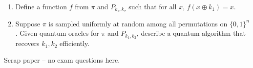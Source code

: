 \documentclass[12pt,answers,addpoints]{exam}
\newcommand{\bit}{\{0,1\}}
\begin{document}
\begin{questions}
\begin{parts}
      \begin{enumerate}[label=\roman*)]
      \item Define a function $f$ from $\pi$ and $P_{k_1,k_2}$ such
        that for all $x$, $f(x\oplus k_1) = x$.
        \newpage
      \item Suppose $\pi$ is sampled uniformly at random among all
        permutations on $\bit^n$. Given quantum oracles for $\pi$ and
        $P_{k_1,k_2}$, describe a quantum algorithm that recovers
        $k_1,k_2$ efficiently. 
      \end{enumerate}
  \end{parts}
    
\end{questions}
\newpage
\begin{center}
Scrap paper -- no exam questions here.  
\end{center}
\end{document}
